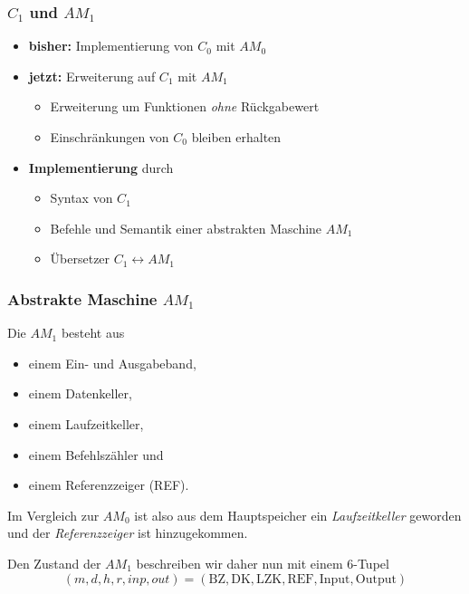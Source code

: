 \documentclass{beamer}
\renewcommand{\emph}[1]{\textbf{#1}}
\begin{document}
\begin{frame}[fragile] \frametitle{$C_1$ und $AM_1$}
	\begin{itemize}
		\item \emph{bisher:} Implementierung von $C_0$ mit $AM_0$
		\item \emph{jetzt:} Erweiterung auf $C_1$ mit $AM_1$ \pause
		\begin{itemize}
			\item Erweiterung um Funktionen \textit{ohne} Rückgabewert
			\item Einschränkungen von $C_0$ bleiben erhalten
		\end{itemize}
		\pause
		\item \emph{Implementierung} durch
		\begin{itemize}
			\item Syntax von $C_1$
			\item Befehle und Semantik einer abstrakten Maschine $AM_1$
			\item Übersetzer $C_1 \leftrightarrow AM_1$
		\end{itemize}
	\end{itemize}
\end{frame}

\begin{frame} \frametitle{Abstrakte Maschine $AM_1$}
	\footnotesize
	Die $AM_1$ besteht aus
	\begin{itemize}
		\item einem Ein- und Ausgabeband,
		\item einem Datenkeller,
		\item einem Laufzeitkeller,
		\item einem Befehlszähler und
		\item einem Referenzzeiger (REF).
	\end{itemize}
	
	Im Vergleich zur $AM_0$ ist also aus dem Hauptspeicher ein \textit{Laufzeitkeller} geworden und der \textit{Referenzzeiger} ist hinzugekommen.
	
	Den Zustand der $AM_1$ beschreiben wir daher nun mit einem $6$-Tupel
	\begin{equation*}
		(m,d,h, r, inp,out) = (\text{BZ}, \text{DK}, \text{LZK}, \text{REF}, \text{Input}, \text{Output})
	\end{equation*}
\end{frame}
\end{document}
